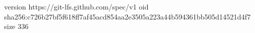 version https://git-lfs.github.com/spec/v1
oid sha256:c726b27bf5f618ff7af45acd854aa2e3505a223a44b594361bb505d14521d4f7
size 336

